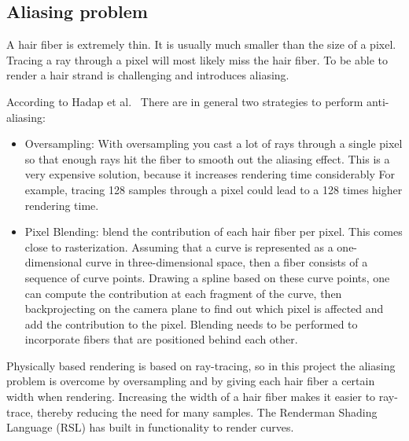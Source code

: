 \documentclass[11pt,a4paper]{report}
\begin{document}
\subsection{Aliasing problem}

A hair fiber is extremely thin. It is usually much smaller than the size of a pixel. Tracing a ray through a pixel will most likely miss the hair fiber.  To be able to render a hair strand is challenging and introduces aliasing. 

According to Hadap et al.~\cite{hadap} There are in general two strategies to perform anti-aliasing:

\begin{itemize}
\item Oversampling: With oversampling you cast a lot of rays through a single pixel so that enough rays hit the fiber to smooth out the aliasing effect. This is a very expensive solution, because it increases rendering time considerably For example, tracing 128 samples through a pixel could lead to a 128 times higher rendering time.



\item Pixel Blending: blend the contribution of each hair fiber per pixel. This comes close to rasterization. Assuming that a curve is represented as a one-dimensional curve in three-dimensional space, then a fiber consists of a sequence of curve points. Drawing a spline based on these curve points, one can compute the contribution at each fragment of the curve, then backprojecting on the camera plane to find out which pixel is affected and add the contribution to the pixel. Blending needs to be performed to incorporate fibers that are positioned behind each other.

\end{itemize}

Physically based rendering is based on ray-tracing, so in this project the aliasing problem is overcome by oversampling and by giving each hair fiber a certain width when rendering. Increasing the width of a hair fiber makes it easier to ray-trace, thereby reducing the need for many samples. The Renderman Shading Language (RSL) has built in functionality to render curves. 
\end{document}
